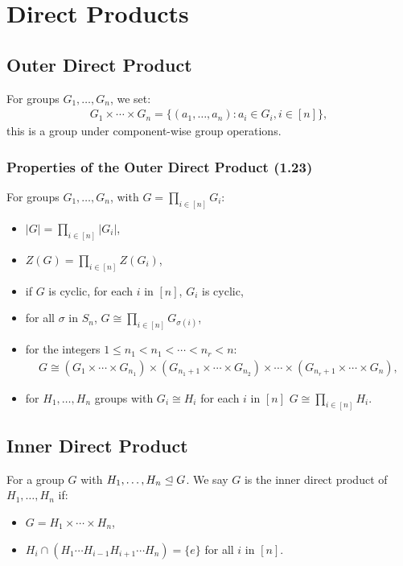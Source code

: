 \section{Direct Products}

\subsection{Outer Direct Product}

For groups $G_1, \ldots, G_n$, we set: \begin{align*}
    G_1 \times \cdots \times G_n = \{(a_1, \ldots, a_n) : a_i \in G_i, i \in [n] \},
\end{align*} this is a group under component-wise group operations.

\subsubsection{Properties of the Outer Direct Product (1.23)} \label{1.23}

For groups $G_1, \ldots, G_n$, with $G = \prod_{i \in [n]} G_i$: \begin{itemize}
    \item $|G| = \prod_{i \in [n]}|G_i|$,
    \item $Z(G) = \prod_{i \in [n]}Z(G_i)$,
    \item if $G$ is cyclic, for each $i$ in $[n]$, $G_i$ is cyclic,
    \item for all $\sigma$ in $S_n$, $G \cong \prod_{i \in [n]} G_{\sigma(i)}$,
    \item for the integers $1 \leq n_1 < n_1 < \cdots < n_r < n$:
        \begin{gather*}
            G \cong 
            (G_1 \times \cdots \times G_{n_1}) \times 
            (G_{n_1 + 1} \times \cdots \times G_{n_2}) \times \cdots \times
            (G_{n_r + 1} \times \cdots \times G_n),
        \end{gather*}
    \item for $H_1, \ldots, H_n$ groups with $G_i \cong H_i$ for each $i$ in $[n]$
        $G \cong \prod_{i \in [n]} H_i$.
\end{itemize}

\subsection{Inner Direct Product}

For a group $G$ with $H_1, \ldots, H_n \trianglelefteq G$. We say $G$ is the
inner direct product of $H_1, \ldots, H_n$ if: \begin{itemize}
    \item $G = H_1 \times \cdots \times H_n$,
    \item $H_i \cap (H_1 \cdots H_{i - 1} H_{i + 1} \cdots H_n) = \{e\}$ 
        for all $i$ in $[n]$.  
\end{itemize}

